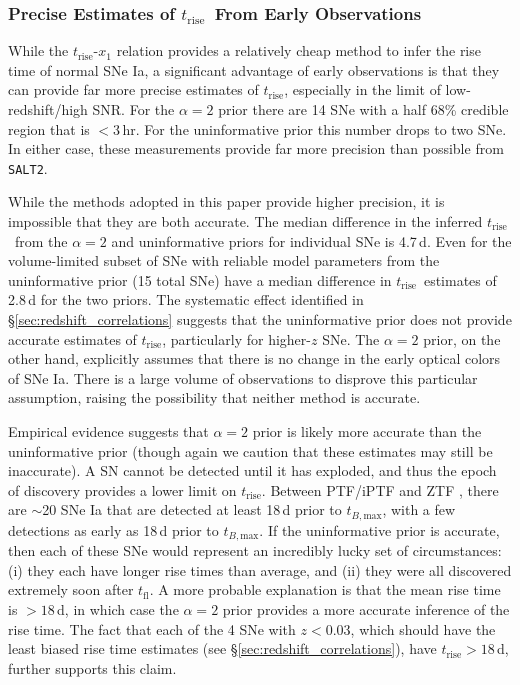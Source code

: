\documentclass[twocolumn]{./aastex63}
\newcommand{\tfl}{$t_\mathrm{fl}$}
\newcommand{\trise}{$t_\mathrm{rise}$}
\newcommand{\tbmax}{$t_{B,\mathrm{max}}$}
\begin{document}
\subsubsection{Precise Estimates of \trise\ From Early Observations}

While the \trise-$x_1$ relation provides a relatively cheap method to infer the
rise time of normal SNe Ia, a significant advantage of early observations is
that they can provide far more precise estimates of \trise, especially in the
limit of low-redshift/high SNR. For the $\alpha = 2$ prior there are 14 SNe with
a half 68\% credible region that is $< 3$\,hr. For the uninformative prior this
number drops to two SNe. In either case, these measurements provide far more
precision than possible from \texttt{SALT2}.

While the methods adopted in this paper provide higher precision, it is
impossible that they are both accurate. The median difference in the inferred
\trise\ from the $\alpha = 2$ and uninformative priors for individual SNe is
4.7\,d. Even for the volume-limited subset of SNe with reliable model parameters
from the uninformative prior (15 total SNe) have a median difference in \trise\
estimates of 2.8\,d for the two priors. The systematic effect identified in
\S\ref{sec:redshift_correlations} suggests that the uninformative prior does not
provide accurate estimates of \trise, particularly for higher-$z$ SNe. The
$\alpha = 2$ prior, on the other hand, explicitly assumes that there is no
change in the early optical colors of SNe Ia. There is a large volume of
observations to disprove this particular assumption, raising the possibility
that neither method is accurate.

Empirical evidence suggests that $\alpha = 2$ prior is likely more accurate than
the uninformative prior (though again we caution that these estimates may still
be inaccurate). A SN cannot be detected until it has exploded, and thus the
epoch of discovery provides a lower limit on \trise. Between PTF/iPTF
\citep{Papadogiannakis19} and ZTF \citep{Yao19}, there are $\sim$20 SNe Ia that
are detected at least 18\,d prior to \tbmax, with a few detections as early as
18\,d prior to \tbmax. If the uninformative prior is accurate, then each of
these SNe would represent an incredibly lucky set of circumstances: (i) they
each have longer rise times than average, and (ii) they were all discovered
extremely soon after \tfl. A more probable explanation is that the mean rise
time is $> 18$\,d, in which case the $\alpha = 2$ prior provides a more accurate
inference of the rise time. The fact that each of the 4 SNe with $z < 0.03$,
which should have the least biased rise time estimates (see
\S\ref{sec:redshift_correlations}), have \trise$ > 18$\,d, further supports this
claim.
\end{document}

